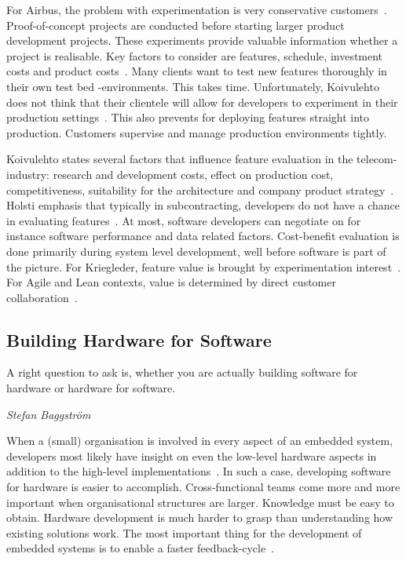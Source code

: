 \documentclass[english]{tktltiki2}
\begin{document}
For Airbus, the problem with experimentation is very conservative customers~\cite{Koi15}. Proof-of-concept projects are conducted before starting larger product development projects. These experiments provide valuable information whether a project is realisable. Key factors to consider are features, schedule, investment costs and product costs~\cite{Koi15}. Many clients want to test new features thoroughly in their own test bed -environments. This takes time. Unfortunately, Koivulehto does not think that their clientele will allow for developers to experiment in their production settings~\cite{Koi15}. This also prevents for deploying features straight into production. Customers supervise and manage production environments tightly.

Koivulehto states several factors that influence feature evaluation in the telecom-industry: research and development costs, effect on production cost, competitiveness, suitability for the architecture and company product strategy~\cite{Koi15}. Holsti emphasis that typically in subcontracting, developers do not have a chance in evaluating features~\cite{Hol15b}. At most, software developers can negotiate on for instance software performance and data related factors. Cost-benefit evaluation is done primarily during system level development, well before software is part of the picture. For Kriegleder, feature value is brought by experimentation interest~\cite{Kri15}. For Agile and Lean contexts, value is determined by direct customer collaboration~\cite{BT15, Pet15}.

\subsection{Building Hardware for Software}

\epigraph{A right question to ask is, whether you are actually building software for hardware or hardware for software.}{\textit{Stefan Baggström~\cite{BT15}}}

When a (small) organisation is involved in every aspect of an embedded system, developers most likely have insight on even the low-level hardware aspects in addition to the high-level implementations~\cite{Kri15}. In such a case, developing software for hardware is easier to accomplish. Cross-functional teams come more and more important when organisational structures are larger. Knowledge must be easy to obtain. Hardware development is much harder to grasp than understanding how existing solutions work. The most important thing for the development of embedded systems is to enable a faster feedback-cycle~\cite{BT15, Hol15a}.
\end{document}
